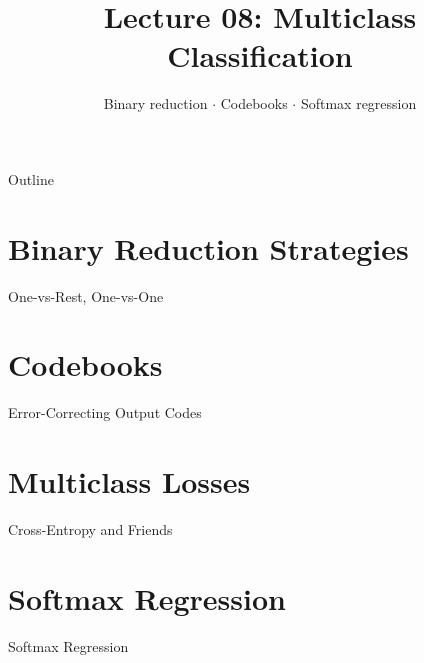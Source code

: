 \documentclass[aspectratio=169]{beamer}
\title{Lecture 08: Multiclass Classification}
\subtitle{Binary reduction $\cdot$ Codebooks $\cdot$ Softmax regression}
\date{}
\begin{document}
\begin{frame}\titlepage\end{frame}

\begin{frame}{Outline}
  \tableofcontents
\end{frame}

\section{Binary Reduction Strategies}
\begin{frame}{One-vs-Rest, One-vs-One}
\end{frame}

\section{Codebooks}
\begin{frame}{Error-Correcting Output Codes}
\end{frame}

\section{Multiclass Losses}
\begin{frame}{Cross-Entropy and Friends}
\end{frame}

\section{Softmax Regression}
\begin{frame}{Softmax Regression}
\end{frame}
\end{document}
